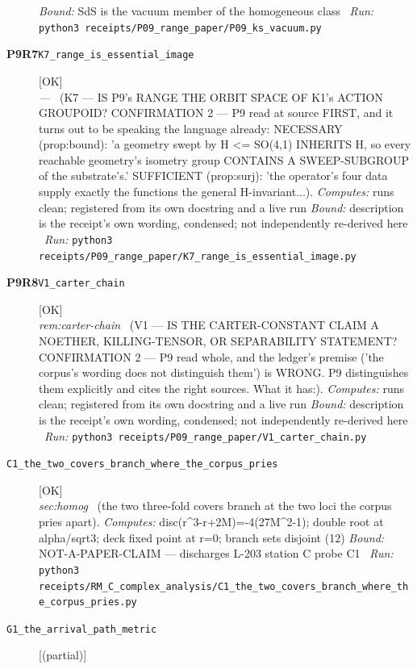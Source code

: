 \begin{description}
 \emph{Bound:} SdS is the vacuum member of the homogeneous class
\ \emph{Run:} \texttt{python3 receipts/P09\_range\_paper/P09\_ks\_vacuum.py}
\item[\rcptlabel{K7_range_is_essential_image}{P9R7}\textbf{P9R7}\quad\texttt{K7\_range\_is\_essential\_image}]\hfill\textsf{[OK]}\\
\textit{---} \ (K7 --- IS P9's RANGE THE ORBIT SPACE OF K1's ACTION GROUPOID? CONFIRMATION 2 --- P9 read at source FIRST, and it turns out to be speaking the language already: NECESSARY (prop:bound): 'a geometry swept by H <= SO(4,1) INHERITS H, so every reachable geometry's isometry group CONTAINS A SWEEP-SUBGROUP of the substrate's.' SUFFICIENT (prop:surj): 'the operator's four data supply exactly the functions the general H-invariant...). 
\emph{Computes:} runs clean; registered from its own docstring and a live run
 \emph{Bound:} description is the receipt's own wording, condensed; not independently re-derived here
\ \emph{Run:} \texttt{python3 receipts/P09\_range\_paper/K7\_range\_is\_essential\_image.py}
\item[\rcptlabel{V1_carter_chain}{P9R8}\textbf{P9R8}\quad\texttt{V1\_carter\_chain}]\hfill\textsf{[OK]}\\
\textit{rem:carter-chain} \ (V1 --- IS THE CARTER-CONSTANT CLAIM A NOETHER, KILLING-TENSOR, OR SEPARABILITY STATEMENT? CONFIRMATION 2 --- P9 read whole, and the ledger's premise ('the corpus's wording does not distinguish them') is WRONG. P9 distinguishes them explicitly and cites the right sources. What it has:). 
\emph{Computes:} runs clean; registered from its own docstring and a live run
 \emph{Bound:} description is the receipt's own wording, condensed; not independently re-derived here
\ \emph{Run:} \texttt{python3 receipts/P09\_range\_paper/V1\_carter\_chain.py}
\item[\label{rcpt:C1_the_two_covers_branch_where_the_corpus_pries}\textbf{}\quad\texttt{C1\_the\_two\_covers\_branch\_where\_the\_corpus\_pries}]\hfill\textsf{[OK]}\\
\textit{sec:homog} \ (the two three-fold covers branch at the two loci the corpus pries apart). 
\emph{Computes:} disc(r\textasciicircum{}3-r+2M)=-4(27M\textasciicircum{}2-1); double root at alpha/sqrt3; deck fixed point at r=0; branch sets disjoint (12)
 \emph{Bound:} NOT-A-PAPER-CLAIM --- discharges L-203 station C probe C1
\ \emph{Run:} \texttt{python3 receipts/RM\_C\_complex\_analysis/C1\_the\_two\_covers\_branch\_where\_the\_corpus\_pries.py}
\item[\label{rcpt:G1_the_arrival_path_metric}\textbf{}\quad\texttt{G1\_the\_arrival\_path\_metric}]\hfill\textsf{[(partial)]}\\

\end{description}
